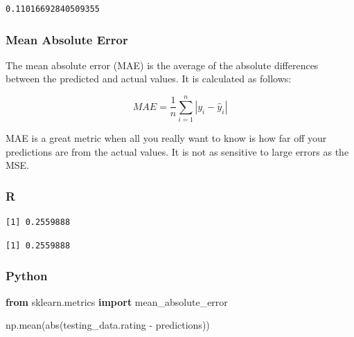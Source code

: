 \documentclass[
  letterpaper,
]{krantz}
\newenvironment{Shaded}{}{}
\newcommand{\BuiltInTok}[1]{\textcolor[rgb]{0.00,0.50,0.00}{#1}}
\newcommand{\FunctionTok}[1]{\textcolor[rgb]{0.02,0.16,0.49}{#1}}
\newcommand{\ImportTok}[1]{\textcolor[rgb]{0.00,0.50,0.00}{\textbf{#1}}}
\newcommand{\NormalTok}[1]{#1}
\newcommand{\OperatorTok}[1]{\textcolor[rgb]{0.40,0.40,0.40}{#1}}
\newcommand{\SpecialCharTok}[1]{\textcolor[rgb]{0.25,0.44,0.63}{#1}}
\begin{document}
\begin{verbatim}
0.11016692840509355
\end{verbatim}

\subsubsection{Mean Absolute Error}\label{mean-absolute-error}

The mean absolute error (MAE) is the average of the absolute differences
between the predicted and actual values. It is calculated as follows:

\[MAE = \frac{1}{n}\sum_{i=1}^{n}|y_i - \hat{y}_i|\]

MAE is a great metric when all you really want to know is how far off
your predictions are from the actual values. It is not as sensitive to
large errors as the MSE.

\subsubsection{R}

\begin{Shaded}
\end{Shaded}

\begin{verbatim}
[1] 0.2559888
\end{verbatim}

\begin{Shaded}
\end{Shaded}

\begin{verbatim}
[1] 0.2559888
\end{verbatim}

\subsubsection{Python}

\begin{Shaded}
\begin{Highlighting}[]
\ImportTok{from}\NormalTok{ sklearn.metrics }\ImportTok{import}\NormalTok{ mean\_absolute\_error}

\NormalTok{np.mean(}\BuiltInTok{abs}\NormalTok{(testing\_data.rating }\OperatorTok{{-}}\NormalTok{ predictions))}
\end{Highlighting}
\end{Shaded}
\end{document}
